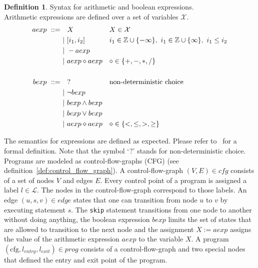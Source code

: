 \documentclass[11pt,a4paper,titlepage]{article}
\theoremstyle{definition}
\newtheorem{definition}{Definition}[section]
\begin{document}
\begin{definition}\label{def:arith_bool_syntax}
    Syntax for arithmetic and boolean expressions. \\
    Arithmetic expressions are defined over a set of variables $\mathcal{X}$.
    \begin{align*}
        \setlength{\jot}{15pt}
        aexp \ ::= \ & \ \ X && X \in \mathcal{X} \\
        &| \  [i_1, i_2] && i_1 \in \mathbb{Z} \cup \{ -\infty \},\ i_1 \in \mathbb{Z} \cup \{\infty \},\ i_1 \leq i_2  \\
        &| \  - aexp \\
        &| \  aexp \diamond aexp && \diamond \in \{ +, -, *, / \}\\
        \\
        bexp \ ::= \ & \ \ ?  && \text{non-deterministic choice} \\
        &| \  \neg bexp \\
        &| \  bexp \land bexp \\
        &| \  bexp \lor bexp \\
        &| \  aexp \diamond aexp && \diamond \in \{<, \leq, >, \geq \}\\
    \end{align*}
\end{definition}

The semantics for expressions are defined as expected. 
Please refer to~\cite{UrbanPhd} for a formal definition. 
Note that the symbol `?' stands for non-deterministic choice.\\

Programs are modeled as control-flow-graphs (CFG) (see definition~\ref{def:control_flow_graph}). 
A control-flow-graph $(V, E) \in cfg$ consists of a set of nodes $V$ and edges $E$.
Every control point of a program is assigned a label $l \in \mathcal{L}$. 
The nodes in the control-flow-graph correspond to those labels. 
An edge $(u, s, v) \in edge$ states that one can transition from node
$u$ to $v$ by executing statement $s$. 
The \texttt{skip} statement transitions from one node to another without doing anything, 
the boolean expression $bexp$ limits the set of states
that are allowed to transition to the next node and the assignment $X := aexp$ assigns the value of the arithmetic expression $aexp$
to the variable $X$. A program $(\text{cfg}, l_{entry}, l_{exit}) \in prog$ consists of a control-flow-graph and two special 
nodes that defined the entry and exit point of the program.
\end{document}
